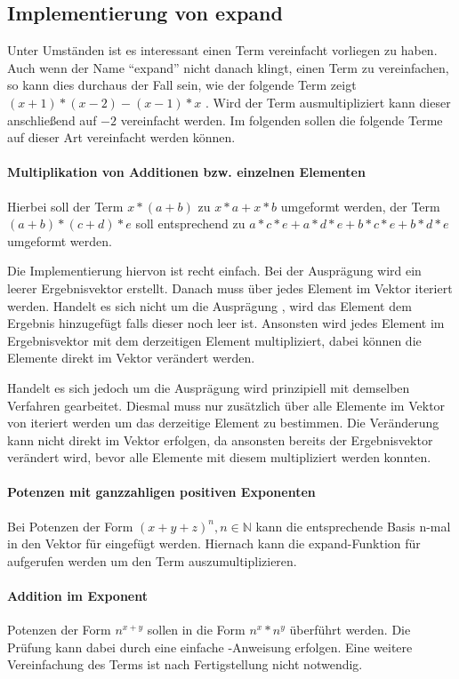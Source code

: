 \documentclass[11pt,a4paper, ngerman]{article}
\begin{document}
\subsection{Implementierung von expand}
Unter Umständen ist es interessant einen Term vereinfacht vorliegen zu haben. Auch wenn der Name ``expand'' nicht danach klingt, einen Term zu vereinfachen, so kann dies durchaus der Fall sein, wie der folgende Term zeigt $(x + 1)*(x - 2) - (x - 1)*x$ \cite{SymPyExpand}. Wird der Term ausmultipliziert kann dieser anschließend auf $-2$ vereinfacht werden. Im folgenden sollen die folgende Terme auf dieser Art vereinfacht werden können.

\paragraph{Multiplikation von Additionen bzw. einzelnen Elementen} Hierbei soll der Term $x*(a+b)$ zu $x*a+x*b$ umgeformt werden, der Term $(a+b)*(c+d)*e$ soll entsprechend zu $a*c*e + a*d*e + b*c*e + b*d*e$ umgeformt werden.

Die Implementierung hiervon ist recht einfach. Bei der Ausprägung  wird ein leerer Ergebnisvektor erstellt. Danach muss über jedes Element im Vektor iteriert werden. Handelt es sich nicht um die Ausprägung , wird das Element dem Ergebnis hinzugefügt falls dieser noch leer ist. Ansonsten wird jedes Element im Ergebnisvektor mit dem derzeitigen Element multipliziert, dabei können die Elemente direkt im Vektor verändert werden.

Handelt es sich jedoch um die Ausprägung  wird prinzipiell mit demselben Verfahren gearbeitet. Diesmal muss nur zusätzlich über alle Elemente im Vektor von  iteriert werden um das derzeitige Element zu bestimmen. Die Veränderung kann nicht direkt im Vektor erfolgen, da ansonsten bereits der Ergebnisvektor verändert wird, bevor alle Elemente mit diesem multipliziert werden konnten.

\paragraph{Potenzen mit ganzzahligen positiven Exponenten} Bei Potenzen der Form $(x+y+z)^n, n \in \mathbb{N}$ kann die entsprechende Basis n-mal in den Vektor für  eingefügt werden. Hiernach kann die expand-Funktion für  aufgerufen werden um den Term auszumultiplizieren. 

\paragraph{Addition im Exponent} Potenzen der Form $n^{x+y}$ sollen in die Form $n^x*n^y$ überführt werden. Die Prüfung kann dabei durch eine einfache -Anweisung erfolgen. Eine weitere Vereinfachung des Terms ist nach Fertigstellung nicht notwendig.
\end{document}
